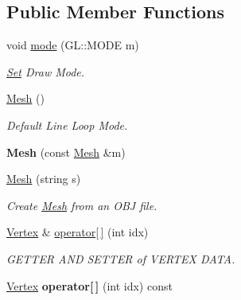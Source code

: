 \subsection*{Public Member Functions}
\begin{DoxyCompactItemize}
\item 
\hypertarget{structvsr_1_1_mesh_a14a7a19827911fb814b9c7adba127987}{void \hyperlink{structvsr_1_1_mesh_a14a7a19827911fb814b9c7adba127987}{mode} (G\-L\-::\-M\-O\-D\-E m)}\label{structvsr_1_1_mesh_a14a7a19827911fb814b9c7adba127987}

\begin{DoxyCompactList}\small\item\em \hyperlink{classvsr_1_1_set}{Set} Draw Mode. \end{DoxyCompactList}\item 
\hypertarget{structvsr_1_1_mesh_a21c523a714eb3678d9f861494c10882b}{\hyperlink{structvsr_1_1_mesh_a21c523a714eb3678d9f861494c10882b}{Mesh} ()}\label{structvsr_1_1_mesh_a21c523a714eb3678d9f861494c10882b}

\begin{DoxyCompactList}\small\item\em Default Line Loop Mode. \end{DoxyCompactList}\item 
\hypertarget{structvsr_1_1_mesh_af06b11ba9f89b23d40020d8241f213d2}{{\bfseries Mesh} (const \hyperlink{structvsr_1_1_mesh}{Mesh} \&m)}\label{structvsr_1_1_mesh_af06b11ba9f89b23d40020d8241f213d2}

\item 
\hypertarget{structvsr_1_1_mesh_ae63b84dd585d561778eca5de3b52ad9b}{\hyperlink{structvsr_1_1_mesh_ae63b84dd585d561778eca5de3b52ad9b}{Mesh} (string s)}\label{structvsr_1_1_mesh_ae63b84dd585d561778eca5de3b52ad9b}

\begin{DoxyCompactList}\small\item\em Create \hyperlink{structvsr_1_1_mesh}{Mesh} from an O\-B\-J file. \end{DoxyCompactList}\item 
\hypertarget{structvsr_1_1_mesh_a01f69e34347699fba6f36cc7f87d6d54}{\hyperlink{structvsr_1_1_vertex}{Vertex} \& \hyperlink{structvsr_1_1_mesh_a01f69e34347699fba6f36cc7f87d6d54}{operator\mbox{[}$\,$\mbox{]}} (int idx)}\label{structvsr_1_1_mesh_a01f69e34347699fba6f36cc7f87d6d54}

\begin{DoxyCompactList}\small\item\em G\-E\-T\-T\-E\-R A\-N\-D S\-E\-T\-T\-E\-R of V\-E\-R\-T\-E\-X D\-A\-T\-A. \end{DoxyCompactList}\item 
\hypertarget{structvsr_1_1_mesh_a6ed669681a3588f0ad4770228dd39cc1}{\hyperlink{structvsr_1_1_vertex}{Vertex} {\bfseries operator\mbox{[}$\,$\mbox{]}} (int idx) const }\label{structvsr_1_1_mesh_a6ed669681a3588f0ad4770228dd39cc1}


\end{DoxyCompactItemize}
